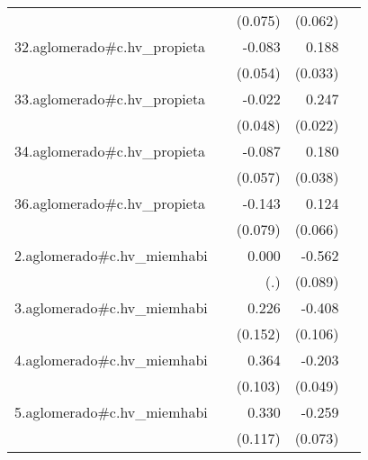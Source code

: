 {\begin{longtable}{l*{4}{D{.}{.}{-1}}}
            &                     &     (0.075)         &     (0.062)         &                     \\
\addlinespace
32.aglomerado#c.hv\_propieta&                     &      -0.083         &       0.188\sym{***}&                     \\
            &                     &     (0.054)         &     (0.033)         &                     \\
\addlinespace
33.aglomerado#c.hv\_propieta&                     &      -0.022         &       0.247\sym{***}&                     \\
            &                     &     (0.048)         &     (0.022)         &                     \\
\addlinespace
34.aglomerado#c.hv\_propieta&                     &      -0.087         &       0.180\sym{***}&                     \\
            &                     &     (0.057)         &     (0.038)         &                     \\
\addlinespace
36.aglomerado#c.hv\_propieta&                     &      -0.143         &       0.124         &                     \\
            &                     &     (0.079)         &     (0.066)         &                     \\
\addlinespace
2.aglomerado#c.hv\_miemhabi&                     &       0.000         &      -0.562\sym{***}&                     \\
            &                     &         (.)         &     (0.089)         &                     \\
\addlinespace
3.aglomerado#c.hv\_miemhabi&                     &       0.226         &      -0.408\sym{***}&                     \\
            &                     &     (0.152)         &     (0.106)         &                     \\
\addlinespace
4.aglomerado#c.hv\_miemhabi&                     &       0.364\sym{***}&      -0.203\sym{***}&                     \\
            &                     &     (0.103)         &     (0.049)         &                     \\
\addlinespace
5.aglomerado#c.hv\_miemhabi&                     &       0.330\sym{**} &      -0.259\sym{***}&                     \\
            &                     &     (0.117)         &     (0.073)         &                     \\

\end{longtable}}
